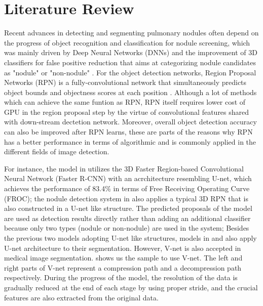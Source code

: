 \documentclass[conference]{IEEEtran}
\begin{document}
\section{Literature Review}
Recent advances in detecting and segmenting pulmonary nodules often depend on the progress of object recognition and classification for nodule screening, which was mainly driven by Deep Neural Networks (DNNs) \cite{NIPS2013_5207} and the improvement of 3D classifiers for false positive reduction that aims at categorizing nodule candidates as "nodule" or "non-nodule" \cite{doi:10.1118/1.1387272}. For the object detection networks, Region Proposal Networks (RPN) is a fully-convolutional network that simultaneously predicts object bounds and objectness scores at each position \cite{NIPS2015_5638}. Although a lot of methods which can achieve the same funtion as RPN, RPN itself requires lower cost of GPU in the region proposal step by the virtue of convolutional features shared with down-stream dectetion network. Moreover, overall object detection accuracy can also be improved after RPN learns, these are parts of the reasons why RPN has a better performance in terms of algorithmic and is commonly applied in the different fields of image detection.


For instance, the model in \cite{10.1007/978-3-319-99247-1_17} utilizes the 3D Faster Region-based Convolutional Neural Network (Faster R-CNN) with an acrchitecture resembling U-net, which achieves the performance of 83.4$\%$ in terms of Free Receiving Operating Curve (FROC); the nodule detection system in \cite{8642524} also applies a typical 3D RPN that is also constructed in a U-net like structure. The predicted proposals of the model are used as detection results directly rather than adding an additional classifier because only two types (nodule or non-nodule) are used in the system; Besides the previous two models adopting U-net like structures, models in \cite{8363630} and \cite{10.1007/978-3-319-24574-4_28} also apply U-net architecture to their segmentation. However, V-net is also accepted in medical image segmentation. \cite{7785132} shows us the sample to use V-net. The left and right parts of V-net represent a compression path and a decompression path respectively. During the progress of the model, the resolution of the data is gradually reduced at the end of each stage by using proper stride, and the crucial features are also extracted from the original data.
\end{document}
